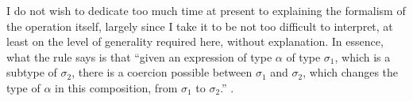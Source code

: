 \documentclass[12pt]{amsart}
\begin{document}
\begin{prooftree}
\end{prooftree}
I do not wish to dedicate too much time at present to explaining the formalism of the operation itself, largely since I take it to be not too difficult to interpret, at least on the level of generality required here, without explanation. In essence, what the rule says is that ``given an expression of type $\alpha$ of type $\sigma_1$, which is a subtype of $\sigma_2$, there is a coercion possible between $\sigma_1$ and $\sigma_2$, which changes the type of $\alpha$ in this composition, from $\sigma_1$ to $\sigma_2$.'' \cite[114]{Pustejovsky93}.
\end{document}
